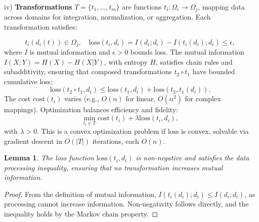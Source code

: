 \documentclass{amsart}
\newtheorem{lem}{Lemma}
\begin{document}

iv) \textbf{Transformations} \( T = \{t_1, \dots, t_m\} \) are functions \( t_i: \Omega_i \to \Omega_j \), mapping data across domains for integration, normalization, or aggregation.
%
Each transformation satisfies:

\begin{equation}
\label{subsec:transformations}
t_i(d_i(t)) \in \Omega_j, \quad \text{loss}(t_i, d_i) = I(d_i; d_i) - I(t_i(d_i); d_i) \leq \epsilon,
\end{equation}
%
where \( I \) is mutual information and \( \epsilon > 0 \) bounds loss. The mutual information \( I(X; Y) = H(X) - H(X|Y) \), with entropy \( H \), satisfies chain rules and subadditivity, ensuring that composed transformations \( t_2 \circ t_1 \) have bounded cumulative loss:
%
\[
\text{loss}(t_2 \circ t_1, d_i) \leq \text{loss}(t_1, d_i) + \text{loss}(t_2, t_1(d_i)).
\]
%
The cost \( \text{cost}(t_i) \) varies (e.g., \( O(n) \) for linear, \( O(n^2) \) for complex mappings). Optimization balances efficiency and fidelity:
\[
\min_{t_i \in T} \text{cost}(t_i) + \lambda \text{loss}(t_i, d_i),
\]
with \( \lambda > 0 \). This is a convex optimization problem if \( \text{loss} \) is convex, solvable via gradient descent in \( O(|T|) \) iterations, each \( O(n) \).

\begin{lem}
The loss function \( \text{loss}(t_i, d_i) \) is non-negative and satisfies the data processing inequality, ensuring that no transformation increases mutual information.
\end{lem}

\begin{proof}
From the definition of mutual information, \( I(t_i(d_i); d_i) \leq I(d_i; d_i) \), as processing cannot increase information. Non-negativity follows directly, and the inequality holds by the Markov chain property.
\end{proof}

\end{document}
